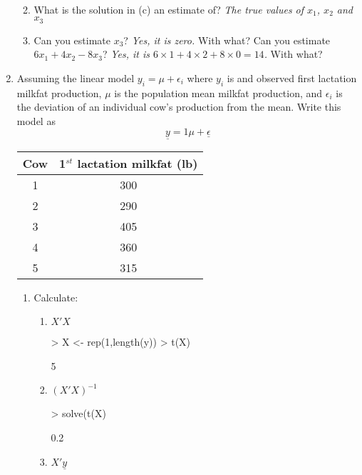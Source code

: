 \documentclass[12pt,a4paper]{paper}
\begin{document}
\begin{enumerate}
\begin{enumerate}
\begin{align*}
\end{align*}
\item What is the solution in (c) an estimate of? \emph{The true values of $x_{1}$, $x_{2}$ and $x_{3}$}
\item Can you estimate $x_{3}$? \emph{Yes, it is zero.} With what? Can you estimate $6x_{1} + 4x_{2} - 8x_{3}$? \emph{Yes, it is $6\times 1 + 4 \times 2 + 8 \times 0 = 14$. } With what?
\end{enumerate}
\item Assuming the linear model $y_{i} = \mu + \epsilon_{i}$ where $y_{i}$ is and observed first lactation milkfat production, $\mu$ is the population mean milkfat production, and $\epsilon_{i}$ is the deviation of an individual cow's production from the mean. Write this model as \[\underline{y} = 1\mu + \underline{\epsilon}\]
\begin{center}
\begin{tabular}{|c|c|}
\hline
Cow & 1$^{st}$ lactation milkfat (lb)\\
\hline\hline
1&300\\
\hline
2&290\\
\hline
3&405\\
\hline
4&360\\
\hline
5&315\\
\hline
\end{tabular}
\end{center}
\begin{enumerate}
\item Calculate:
\begin{enumerate}
\item $X'X$
\begin{Schunk}
\begin{Sinput}
> X <- rep(1,length(y))
> t(X) %*% X
\end{Sinput}
\begin{Soutput}
     [,1]
[1,]    5
\end{Soutput}
\end{Schunk}
\item $(X'X)^{-1}$
\begin{Schunk}
\begin{Sinput}
> solve(t(X) %*% X)
\end{Sinput}
\begin{Soutput}
     [,1]
[1,]  0.2
\end{Soutput}
\end{Schunk}
\item $X'\underline{y}$
\begin{Schunk}

\end{Schunk}
\end{enumerate}
\end{enumerate}
\end{enumerate}
\end{document}
